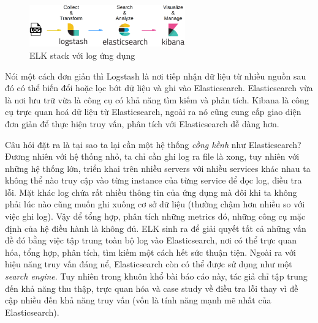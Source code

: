 \begin{figure}[H] %
    \centering %
    \includegraphics[width=0.6\textwidth]{figures/elk_01.png} 
    \caption{ELK stack với log ứng dụng} %
    \label{fig:elk_01}
\end{figure}
Nói một cách đơn giản thì Logstash là nơi tiếp nhận dữ liệu từ nhiều nguồn sau đó có thể biến đổi hoặc lọc bớt dữ liệu và ghi vào Elasticsearch. Elasticsearch vừa là nơi lưu trữ vừa là công cụ có khả năng tìm kiếm và phân tích. Kibana là công cụ trực quan hoá dữ liệu từ Elasticsearch, ngoài ra nó cũng cung cấp giao diện đơn giản để thực hiện truy vấn, phân tích với Elasticsearch dễ dàng hơn.

Câu hỏi đặt ra là tại sao ta lại cần một hệ thống \textit{cồng kềnh} như Elasticsearch? Đương nhiên với hệ thống nhỏ, ta chỉ cần ghi log ra file là xong, tuy nhiên với những hệ thống lớn, triển khai trên nhiều servers với nhiều services khác nhau ta không thể nào truy cập vào từng instance của từng service để đọc log, điều tra lỗi. Mặt khác log chứa rất nhiều thông tin của ứng dụng mà đôi khi ta không phải lúc nào cũng muốn ghi xuống cơ sở dữ liệu (thường chậm hơn nhiều so với việc ghi log). Vậy để tổng hợp, phân tích những metrics đó, những công cụ mặc định của hệ điều hành là không đủ. ELK sinh ra để giải quyết tất cả những vấn đề đó bằng việc tập trung toàn bộ log vào Elasticsearch, nơi có thể trực quan hóa, tổng hợp, phân tích, tìm kiếm một cách hết sức thuận tiện. Ngoài ra với hiệu năng truy vấn đáng nể, Elasticsearch còn có thể được sử dụng như một \textit{search engine}. Tuy nhiên trong khuôn khổ bài báo cáo này, tác giả chỉ tập trung đến khả năng thu thập, trực quan hóa và case study về điều tra lỗi thay vì đề cập nhiều đến khả năng truy vấn (vốn là tính năng mạnh mẽ nhất của Elasticsearch). 